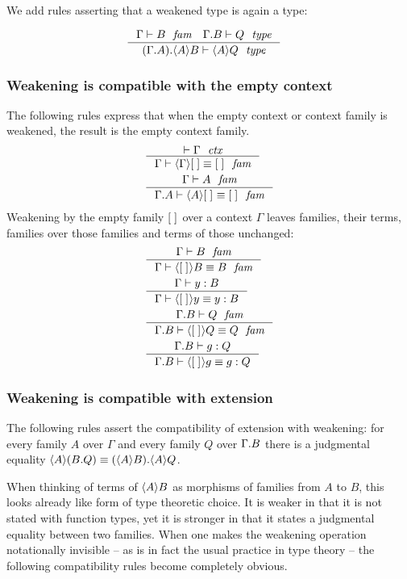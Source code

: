We add rules asserting that a weakened type is again a type:

\begin{align}
& \inference{\jfam{\Gamma}{B}\quad\jtype{\ctxext{\Gamma}{B}}{Q}}{\jtype{\ctxext{{\Gamma}{A}}{\ctxwk{A}{B}}}{\ctxwk{A}{Q}}}
\end{align}

\subsubsection{Weakening is compatible with the empty context}
The following rules express that when the empty context or context family is
weakened, the result is the empty context family.
\begin{align}
& \inference{\jctx{\Gamma}}{\jfameq{\Gamma}{\ctxwk{\Gamma}{\emptyc}}{\emptyf}}\\
& \inference{\jfam{\Gamma}{A}}{\jfameq{\ctxext{\Gamma}{A}}{\ctxwk{A}{\emptyf}}{\emptyf}}
\end{align}
Weakening by the empty family ${[\;]}_{}$ over a context $\Gamma$ leaves families, 
their terms, families over those families and
terms of those unchanged:
\begin{align}
& \inference{\jfam{\Gamma}{B}}{\jfameq{\Gamma}{\ctxwk{\emptyf}{B}}{B}}\\
& \inference{\jterm{\Gamma}{B}{y}}{\jtermeq{\Gamma}{B}{\ctxwk{\emptyf}{y}}{y}}\\
& \inference{\jfam{\ctxext{\Gamma}{B}}{Q}}{\jfameq{\ctxext{\Gamma}{B}}{\ctxwk{\emptyf}{Q}}{Q}}\\
& \inference{\jterm{\ctxext{\Gamma}{B}}{Q}{g}}{\jtermeq{\ctxext{\Gamma}{B}}{Q}{\ctxwk{\emptyf}{g}}{g}}
\end{align}

\subsubsection{Weakening is compatible with extension}\label{comp-we}

The following rules assert the compatibility of extension with weakening: for
every family $A$ over $\Gamma$ and every family $Q$ over $\ctxext{\Gamma}{B}$
there is a
judgmental equality $\ctxwk{A}{\ctxext{B}{Q}}\jdeq\ctxext{\ctxwk{A}{B}}
{\ctxwk{A}{Q}}$. 

When thinking of terms of $\ctxwk{A}{B}$ as morphisms of families from $A$ to
$B$, this looks already like form of type theoretic choice. It is weaker in that
it is not stated with function types, yet it is stronger in that it states a
judgmental equality between two families. When one makes the weakening operation
notationally invisible -- as is in fact the usual practice in type theory -- the
following compatibility rules become completely obvious.

